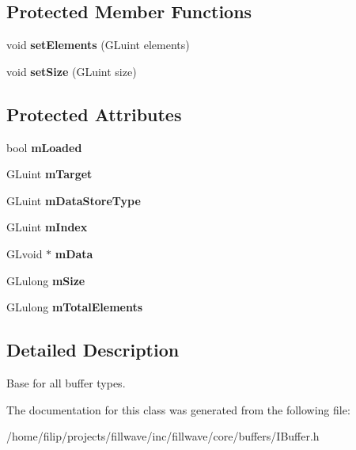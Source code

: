 \subsection*{Protected Member Functions}
\begin{DoxyCompactItemize}
\item 
\mbox{\label{classflw_1_1flc_1_1IBuffer_abfef8a1d484a0a974e1b68899b94793e}} 
void {\bfseries set\+Elements} (G\+Luint elements)
\item 
\mbox{\label{classflw_1_1flc_1_1IBuffer_a07a92c12bc564ea26ef2091915b992e3}} 
void {\bfseries set\+Size} (G\+Luint size)
\end{DoxyCompactItemize}
\subsection*{Protected Attributes}
\begin{DoxyCompactItemize}
\item 
\mbox{\label{classflw_1_1flc_1_1IBuffer_a7012500f1c886ae84e9bd7d878f70a8b}} 
bool {\bfseries m\+Loaded}
\item 
\mbox{\label{classflw_1_1flc_1_1IBuffer_a3d34efd1977e2ea9b859b32458c23236}} 
G\+Luint {\bfseries m\+Target}
\item 
\mbox{\label{classflw_1_1flc_1_1IBuffer_a099516254495f4a99e65121816d02bab}} 
G\+Luint {\bfseries m\+Data\+Store\+Type}
\item 
\mbox{\label{classflw_1_1flc_1_1IBuffer_ad6cf73186e60ec40248b14c5b11f00ee}} 
G\+Luint {\bfseries m\+Index}
\item 
\mbox{\label{classflw_1_1flc_1_1IBuffer_ad576bb156f18bf6050414445ce768737}} 
G\+Lvoid $\ast$ {\bfseries m\+Data}
\item 
\mbox{\label{classflw_1_1flc_1_1IBuffer_af6d84c87b8a85e193de1c7d62e0c5098}} 
G\+Lulong {\bfseries m\+Size}
\item 
\mbox{\label{classflw_1_1flc_1_1IBuffer_a64fbd477df8e2731e70198cf43f59577}} 
G\+Lulong {\bfseries m\+Total\+Elements}
\end{DoxyCompactItemize}


\subsection{Detailed Description}
Base for all buffer types. 

The documentation for this class was generated from the following file\+:\begin{DoxyCompactItemize}
\item 
/home/filip/projects/fillwave/inc/fillwave/core/buffers/I\+Buffer.\+h\end{DoxyCompactItemize}
